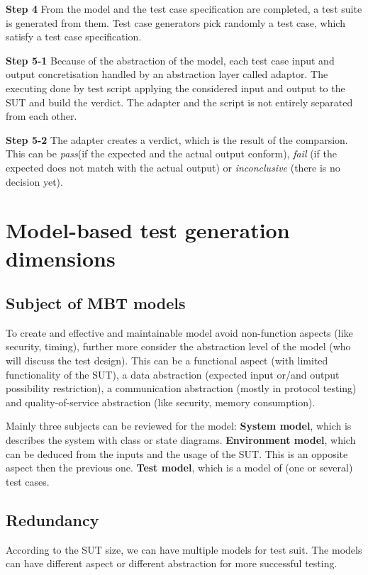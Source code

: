 \textbf{Step 4}
From the model and the test case specification are completed, a test suite is generated from them. Test case generators  pick randomly a test case, which satisfy a test case specification.

\textbf{Step 5-1}
Because of the abstraction of the model, each test case input and output concretisation handled by an abstraction layer called adaptor. The executing done by test script applying the considered input and output to the SUT and build the verdict. The adapter and the script is not entirely separated from each other.

\textbf{Step 5-2}
The adapter creates a verdict, which is the result of the comparsion. This can be \textit{pass}(if the expected and the actual output conform), \textit{fail} (if the expected does not match with the actual output) or \textit{inconclusive} (there is no decision yet).

\section{Model-based test generation dimensions}
\subsection{Subject of MBT models}
To create and effective and maintainable model avoid non-function aspects (like security, timing), further more consider the abstraction level of the model (who will discuss the test design). This can be a functional aspect (with limited functionality of the SUT), a data abstraction (expected input or/and output possibility restriction), a communication abstraction (mostly in protocol testing) and quality-of-service abstraction (like security, memory consumption).

Mainly three subjects can be reviewed for the model:
\textbf{System model}, which is describes the system with class or state diagrams.
\textbf{Environment model}, which can be deduced from the inputs and the usage of the SUT. This is an opposite aspect then the previous one.
\textbf{Test model}, which is a model of (one or several) test cases.

\subsection{Redundancy}
According to the SUT size, we can have multiple models for test suit. The models can have different aspect or different abstraction for more successful testing.

